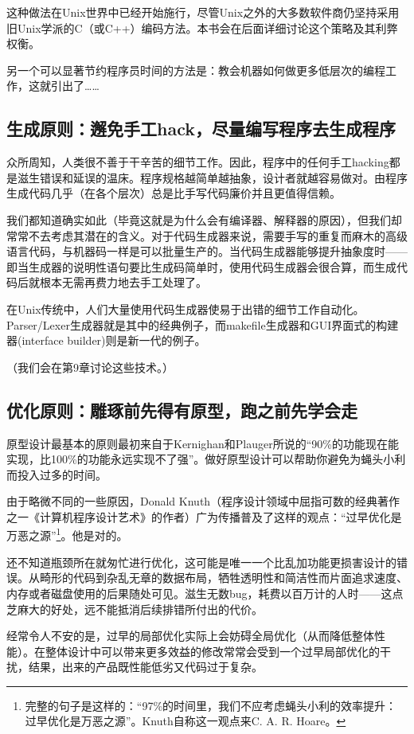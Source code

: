 \documentclass[12pt,oneside]{book}
\begin{document}
这种做法在Unix世界中已经开始施行，尽管Unix之外的大多数软件商仍坚持采用旧Unix学派的C（或C++）编码方法。本书会在后面详细讨论这个策略及其利弊权衡。

另一个可以显著节约程序员时间的方法是：教会机器如何做更多低层次的编程工作，这就引出了……

\subsection{生成原则：邂免手工hack，尽量编写程序去生成程序}
众所周知，人类很不善于干辛苦的细节工作。因此，程序中的任何手工hacking都是滋生错误和延误的温床。程序规格越简单越抽象，设计者就越容易做对。由程序生成代码几乎（在各个层次）总是比手写代码廉价并且更值得信赖。

我们都知道确实如此（毕竟这就是为什么会有编译器、解释器的原因），但我们却常常不去考虑其潜在的含义。对于代码生成器来说，需要手写的重复而麻木的高级语言代码，与机器码一样是可以批量生产的。当代码生成器能够提升抽象度时——即当生成器的说明性语句要比生成码简单时，使用代码生成器会很合算，而生成代码后就根本无需再费力地去手工处理了。

在Unix传统中，人们大量使用代码生成器使易于出错的细节工作自动化。Parser/Lexer生成器就是其中的经典例子，而makefile生成器和GUI界面式的构建器(interface builder)则是新一代的例子。

（我们会在第9章讨论这些技术。）


\subsection{优化原则：雕琢前先得有原型，跑之前先学会走}
原型设计最基本的原则最初来自于Kernighan和Plauger所说的“90\%的功能现在能实现，比100\%的功能永远实现不了强”。做好原型设计可以帮助你避免为蝇头小利而投入过多的时间。

由于略微不同的一些原因，Donald Knuth（程序设计领域中屈指可数的经典著作之一《计算机程序设计艺术》的作者）广为传播普及了这样的观点：“过早优化是万恶之源”\footnote{完整的句子是这样的：“97\%的时间里，我们不应考虑蝇头小利的效率提升：过早优化是万恶之源”。Knuth自称这一观点来C. A. R. Hoare。}。他是对的。

还不知道瓶颈所在就匆忙进行优化，这可能是唯一一个比乱加功能更损害设计的错误。从畸形的代码到杂乱无章的数据布局，牺牲透明性和简洁性而片面追求速度、内存或者磁盘使用的后果随处可见。滋生无数bug，耗费以百万计的人时——这点芝麻大的好处，远不能抵消后续排错所付出的代价。

经常令人不安的是，过早的局部优化实际上会妨碍全局优化（从而降低整体性能）。在整体设计中可以带来更多效益的修改常常会受到一个过早局部优化的干扰，结果，出来的产品既性能低劣又代码过于复杂。
\end{document}

